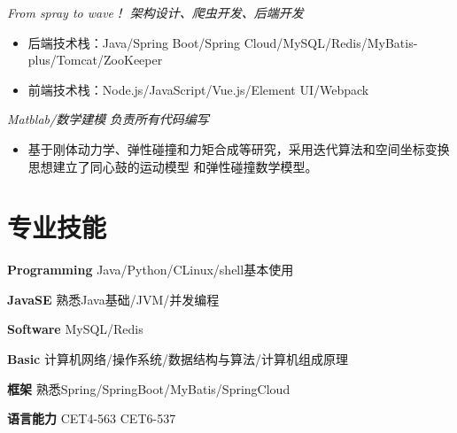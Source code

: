 \documentclass{uniquecv}
\begin{document}
{\it From spray to wave！}   \quad \emph{架构设计、爬虫开发、后端开发}
\vspace{0.4ex}
\begin{itemize}
  \item 后端技术栈：Java/Spring Boot/Spring Cloud/MySQL/Redis/MyBatis-plus/Tomcat/ZooKeeper
  \item 前端技术栈：Node.js/JavaScript/Vue.js/Element UI/Webpack
\end{itemize}

{\it Matblab/数学建模}
\quad \emph{负责所有代码编写}
\vspace{0.4ex}
\begin{itemize}
  \item 基于刚体动力学、弹性碰撞和力矩合成等研究，采用迭代算法和空间坐标变换思想建立了同心鼓的运动模型
和弹性碰撞数学模型。
\end{itemize}
\vspace{0.4ex}


\section{专业技能}
\smallskip
\textbf{Programming}
\quad Java/Python/C\quad Linux/shell基本使用

\textbf{JavaSE} 
\quad 熟悉Java基础/JVM/并发编程

\textbf{Software} 
\quad MySQL/Redis

\textbf{Basic} 
\quad 计算机网络/操作系统/数据结构与算法/计算机组成原理

\textbf{框架} 
\quad 熟悉Spring/SpringBoot/MyBatis/SpringCloud

\textbf{语言能力} 
\quad CET4-563 \quad CET6-537
\end{document}
